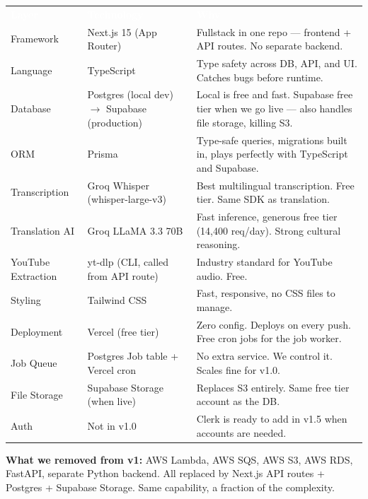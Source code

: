 \documentclass[12pt, a4paper]{article}
\begin{document}
\renewcommand{\arraystretch}{1.5}
\begin{center}
\begin{tabular}{L{3.5cm} L{4cm} L{6cm}}
  \textcolor{white}{\textbf{Layer}} &
  \textcolor{white}{\textbf{Technology}} &
  \textcolor{white}{\textbf{Why}} \\
  Framework & Next.js 15 (App Router) &
  Fullstack in one repo — frontend + API routes. No separate backend. \\
  Language & TypeScript &
  Type safety across DB, API, and UI. Catches bugs before runtime. \\
  Database & Postgres (local dev) $\to$ Supabase (production) &
  Local is free and fast. Supabase free tier when we go live — also handles file storage, killing S3. \\
  ORM & Prisma &
  Type-safe queries, migrations built in, plays perfectly with TypeScript and Supabase. \\
  Transcription & Groq Whisper (whisper-large-v3) &
  Best multilingual transcription. Free tier. Same SDK as translation. \\
  Translation AI & Groq LLaMA 3.3 70B &
  Fast inference, generous free tier (14,400 req/day). Strong cultural reasoning. \\
  YouTube Extraction & yt-dlp (CLI, called from API route) &
  Industry standard for YouTube audio. Free. \\
  Styling & Tailwind CSS &
  Fast, responsive, no CSS files to manage. \\
  Deployment & Vercel (free tier) &
  Zero config. Deploys on every push. Free cron jobs for the job worker. \\
  Job Queue & Postgres Job table + Vercel cron &
  No extra service. We control it. Scales fine for v1.0. \\
  File Storage & Supabase Storage (when live) &
  Replaces S3 entirely. Same free tier account as the DB. \\
  Auth & Not in v1.0 &
  Clerk is ready to add in v1.5 when accounts are needed. \\
\end{tabular}
\end{center}

\begin{tcolorbox}[accentbox]
  \textbf{What we removed from v1:} AWS Lambda, AWS SQS, AWS S3, AWS RDS,
  FastAPI, separate Python backend. All replaced by Next.js API routes +
  Postgres + Supabase Storage. Same capability, a fraction of the complexity.
\end{tcolorbox}
\end{document}
